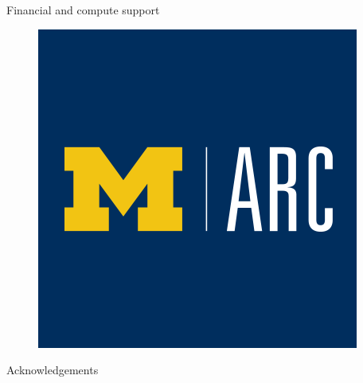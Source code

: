\documentclass[]{beamer}
\begin{document}
\begin{frame}{Financial and compute support}
\begin{minipage}{0.23\linewidth}
\begin{figure}
			\includegraphics[width=0.99\linewidth,trim={0em 3cm 0em 3cm},clip]{back_matter/arc.png}
		\end{figure}
	\end{minipage}
\end{frame}

\begin{frame}{Acknowledgements}
	
\end{frame}
\end{document}
